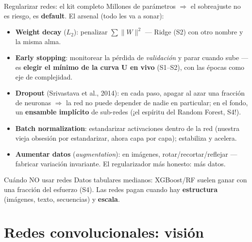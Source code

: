 \documentclass{beamer}
\newcommand{\1}{\mathbb{I}}
\begin{document}
\begin{frame}{Regularizar redes: el kit completo}
\small
Millones de parámetros $\Rightarrow$ el sobreajuste no es riesgo, es \textbf{default}. El arsenal (todo les va a sonar):
\pause
\begin{itemize}\itemsep5pt
  \item \textbf{Weight decay} ($L_2$): penalizar $\sum \|W\|^2$ --- Ridge (S2) con otro nombre y la misma alma.
  \item \textbf{Early stopping}: monitorear la pérdida de \emph{validación} y parar cuando sube --- es \textbf{elegir el mínimo de la curva U en vivo} (S1--S2), con las épocas como eje de complejidad.
  \item \textbf{Dropout} (Srivastava et al., 2014): en cada paso, apagar al azar una fracción de neuronas $\Rightarrow$ la red no puede depender de nadie en particular; en el fondo, un \textbf{ensamble implícito} de sub-redes (¡el espíritu del Random Forest, S4!).
  \item \textbf{Batch normalization}: estandarizar activaciones dentro de la red (nuestra vieja obsesión por estandarizar, ahora capa por capa); estabiliza y acelera.
  \item \textbf{Aumentar datos} (\emph{augmentation}): en imágenes, rotar/recortar/reflejar --- fabricar variación invariante. El regularizador más honesto: más datos.
\end{itemize}
\pause

\begin{block}{Cuándo NO usar redes}
Datos tabulares medianos: XGBoost/RF suelen ganar con una fracción del esfuerzo (S4). Las redes pagan cuando hay \textbf{estructura} (imágenes, texto, secuencias) y \textbf{escala}.
\end{block}
\end{frame}


\section{Redes convolucionales: visión}
\begin{frame}[noframenumbering]
\tableofcontents[currentsection]
\end{frame}
\end{document}
